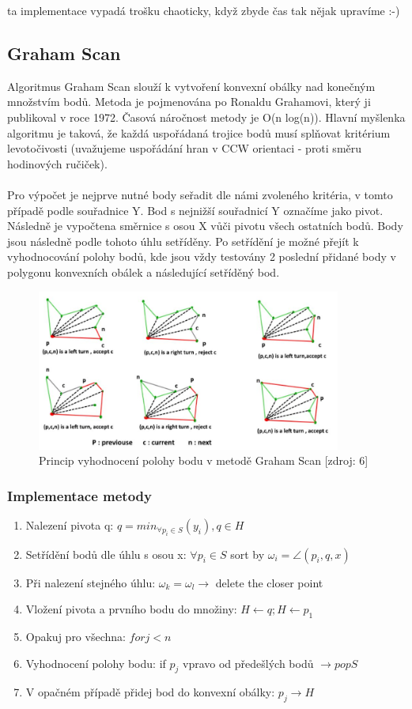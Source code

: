 \documentclass[a4paper, 12pt]{article}
\begin{document}
ta implementace vypadá trošku chaoticky, když zbyde čas tak nějak upravíme :-)

\subsection{Graham Scan}
Algoritmus Graham Scan slouží k vytvoření konvexní obálky nad konečným množstvím bodů. Metoda je pojmenována po Ronaldu Grahamovi, který ji publikoval v roce 1972. Časová náročnost metody je O(n log(n)). Hlavní myšlenka algoritmu je taková, že každá uspořádaná trojice bodů musí splňovat kritérium levotočivosti (uvažujeme uspořádání hran v CCW orientaci - proti směru hodinových ručiček).\\
\\
Pro výpočet je nejprve nutné body seřadit dle námi zvoleného kritéria, v tomto případě podle souřadnice Y. Bod s nejnižší souřadnicí Y označíme jako pivot. Následně je vypočtena směrnice s osou X vůči pivotu všech ostatních bodů. Body jsou následně podle tohoto úhlu setříděny. Po setřídění je možné přejít k vyhodnocování polohy bodů, kde jsou vždy testovány 2 poslední přidané body v polygonu konvexních obálek a následující setříděný bod.

\begin{figure}[h!]
	\centering
	\includegraphics[width=10cm]{graham_scan.jpg}
	\caption{Princip vyhodnocení polohy bodu v metodě Graham Scan [zdroj: 6]}
\end{figure}

\subsubsection{Implementace metody}
\begin{enumerate}
\item Nalezení pivota q:  $ q = min_{\forall p_i \in S} (y_i), q \in H $ 
\item Setřídění bodů dle úhlu s osou x: $ {\forall p_i \in S}$ sort by $ \omega_i = \angle (p_i, q, x)$
\item Při nalezení stejného úhlu: $ \omega_k = \omega_l \rightarrow $ delete the closer point 
\item Vložení pivota a prvního bodu do množiny: $ H \leftarrow q; H \leftarrow p_1$
\item Opakuj pro všechna: $ for j < n $
\item Vyhodnocení polohy bodu: if $ p_j $ vpravo od předešlých bodů $ \rightarrow pop S$
\item V opačném případě přidej bod do konvexní obálky: $ p_{j}  \rightarrow H $
\end{enumerate}
\end{document}
